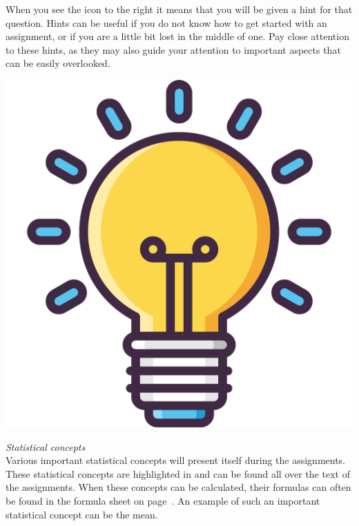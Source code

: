 \begin{minipage}{0.85\textwidth}
When you see the icon to the right it means that you will be given a hint for that question. Hints can be useful if you do not know how to get started with an assignment, or if you are a little bit lost in the middle of one. Pay close attention to these hints, as they may also guide your attention to important aspects that can be easily overlooked.
\end{minipage}%
\hfill%
\begin{minipage}{0.1\textwidth}
\includegraphics[width=\linewidth]{Files/Images/lightbulb.pdf}
\end{minipage}

\clearpage

\textit{Statistical concepts} \\ 

Various important statistical concepts will present itself during the assignments. These statistical concepts are highlighted in  and can be found all over the text of the assignments. When these concepts can be calculated, their formulas can often be found in the formula sheet on page~\pageref{formulasheet}. An example of such an important statistical concept can be the mean. \\

 \\ 

